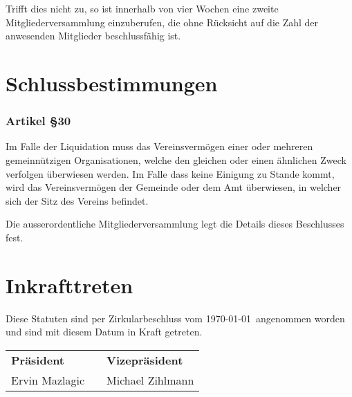 \documentclass[a4paper,10pt,fleqn]{article}
\begin{document}
Trifft dies nicht zu, so ist innerhalb von vier Wochen eine 
zweite Mitgliederversammlung einzuberufen, die ohne
Rücksicht auf die Zahl der anwesenden Mitglieder
beschlussfähig ist.

\section{Schlussbestimmungen}

\subsubsection*{Artikel §30}
Im Falle der Liquidation muss das Vereinsvermögen einer oder
 mehreren gemeinnützigen Organisationen, welche den gleichen
oder einen ähnlichen Zweck verfolgen überwiesen werden. Im
Falle dass keine Einigung zu Stande kommt, wird das
Vereinsvermögen der Gemeinde oder dem Amt überwiesen, in 
welcher sich der Sitz des Vereins befindet.

Die ausserordentliche Mitgliederversammlung legt die Details
dieses Beschlusses fest.

\section{Inkrafttreten}
Diese Statuten sind per Zirkularbeschluss vom
\today~angenommen worden und sind mit diesem Datum in Kraft
getreten. \newline\newline


\begin{tabular}{l r l}
\indent \textbf{Präsident} & 
    \indent \indent \indent \indent \indent \indent &
        \textbf{Vizepräsident} \\
\indent Ervin Mazlagic     & 
    \indent \indent \indent \indent \indent \indent &
        Michael Zihlmann \\
\end{tabular}
\end{document}
